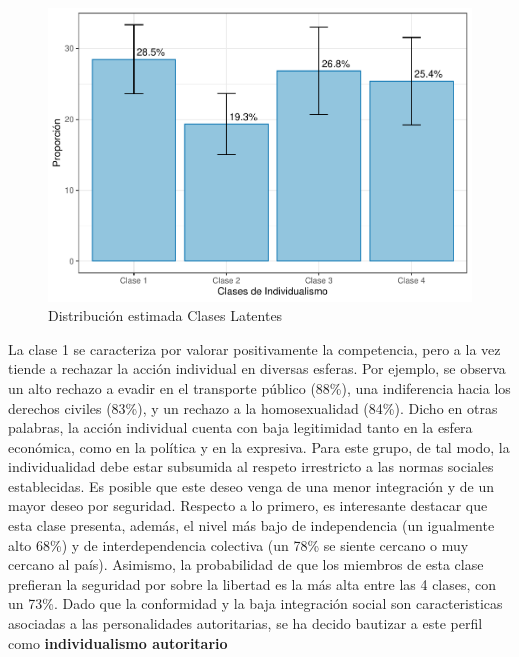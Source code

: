 \documentclass[12pt,twoside]{templates/facsothesis}
\begin{document}
\begin{figure}[!ht]

{\centering \includegraphics[width=1\linewidth,]{tesis_files/figure-latex/unnamed-chunk-11-1} 

}

\caption{Distribución estimada Clases Latentes}\label{fig:unnamed-chunk-11}
\end{figure}
\FloatBarrier

La clase 1 se caracteriza por valorar positivamente la competencia, pero a la vez tiende a rechazar la acción individual en diversas esferas. Por ejemplo, se observa un alto rechazo a evadir en el transporte público (88\%), una indiferencia hacia los derechos civiles (83\%), y un rechazo a la homosexualidad (84\%). Dicho en otras palabras, la acción individual cuenta con baja legitimidad tanto en la esfera económica, como en la política y en la expresiva. Para este grupo, de tal modo, la individualidad debe estar subsumida al respeto irrestricto a las normas sociales establecidas. Es posible que este deseo venga de una menor integración y de un mayor deseo por seguridad. Respecto a lo primero, es interesante destacar que esta clase presenta, además, el nivel más bajo de independencia (un igualmente alto 68\%) y de interdependencia colectiva (un 78\% se siente cercano o muy cercano al país). Asimismo, la probabilidad de que los miembros de esta clase prefieran la seguridad por sobre la libertad es la más alta entre las 4 clases, con un 73\%. Dado que la conformidad \citep{zakrisson2005} y la baja integración social \citep{gidron2020} son caracteristicas asociadas a las personalidades autoritarias, se ha decido bautizar a este perfil como \textbf{individualismo autoritario}
\end{document}
